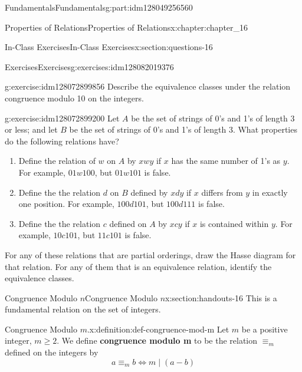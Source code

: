 \documentclass[oneside,10pt,]{book}
\newcommand{\terminology}[1]{\textbf{#1}}
\numberwithin{equation}{section}
\begin{document}
\begin{partptx}{Fundamentals}{}{Fundamentals}{}{}{g:part:idm128049256560}
\begin{chapterptx}{Properties of Relations}{}{Properties of Relations}{}{}{x:chapter:chapter_16}
\begin{sectionptx}{In-Class Exercises}{}{In-Class Exercises}{}{}{x:section:questions-16}
\begin{exercises-subsection}{Exercises}{}{Exercises}{}{}{g:exercises:idm128082019376}
\begin{exercisegroup}
\begin{divisionexerciseeg}{3}{}{}{g:exercise:idm128072899856}%
Describe the equivalence classes under the relation congruence modulo 10 on the integers.%
\end{divisionexerciseeg}%
\begin{divisionexerciseeg}{4}{}{}{g:exercise:idm128072899200}%
Let \(A\) be the set of strings of 0's and 1's of length 3 or less; and let \(B\) be the set of strings of 0's and 1's of length 3. What properties do the following relations have?%
\begin{enumerate}[label=(\alph*)]
\item{}Define the relation of \(w\) on \(A\) by \(x w y\) if \(x\) has the same number of 1's as \(y\). For example, \(01 w 100\), but \(01 w 101\) is false.%
\item{}Define the the relation \(d\)  on \(B\) defined by \(x d y\) if \(x\) differs from \(y\) in exactly one position. For example, \(100 d 101\), but \(100 d 111\) is false.%
\item{}Define the the relation \(c\) defined  on \(A\) by \(x c y\) if \(x\) is contained within \(y\). For example, \(10 c 101\), but \(11 c 101\) is false.%
\end{enumerate}
For any of these relations that are partial orderings, draw the Hasse diagram for that relation.  For any of them that is an equivalence relation, identify the equivalence classes.%
\end{divisionexerciseeg}%
\end{exercisegroup}
\par\medskip\noindent
\end{exercises-subsection}
\end{sectionptx}
%
%
\typeout{************************************************}
\typeout{************************************************}
%
\begin{sectionptx}{Congruence Modulo \(n\)}{}{Congruence Modulo \(n\)}{}{}{x:section:handouts-16}
This is a fundamental relation on the set of integers.%
\begin{definition}{Congruence Modulo \(m\).}{x:definition:def-congruence-mod-m}%
%
\label{g:notation:idm128081890544}%
\label{g:notation:idm128081955168}%
Let \(m\) be a positive integer, \(m\geq 2\).  We define \terminology{congruence modulo m} to be the relation \(\equiv_m\) defined on the integers by%
\begin{equation*}
a \equiv_m b \Leftrightarrow m \mid (a-b)

\end{equation*}
\end{definition}
\end{sectionptx}
\end{chapterptx}
\end{partptx}
\end{document}

